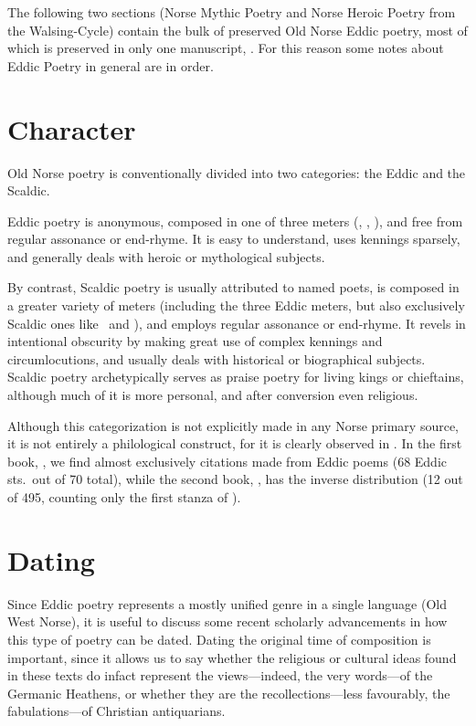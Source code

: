 
The following two sections (Norse Mythic Poetry and Norse Heroic Poetry from the Walsing-Cycle) contain the bulk of preserved Old Norse Eddic poetry, most of which is preserved in only one manuscript, \Regius.  For this reason some notes about Eddic Poetry in general are in order.

\section{Character}

Old Norse poetry is conventionally divided into two categories: the Eddic and the Scaldic.

Eddic poetry is anonymous, composed in one of three meters (\Fornyrdislag, \Ljodahattr, \Malahattr), and free from regular assonance or end-rhyme.  It is easy to understand, uses kennings sparsely, and generally deals with heroic or mythological subjects.

By contrast, Scaldic poetry is usually attributed to named poets, is composed in a greater variety of meters (including the three Eddic meters, but also exclusively Scaldic ones like \Kviduhattr\ and \Drottkvett), and employs regular assonance or end-rhyme.  It revels in intentional obscurity by making great use of complex kennings and circumlocutions, and usually deals with historical or biographical subjects.  Scaldic poetry archetypically serves as praise poetry for living kings or chieftains, although much of it is more personal, and after conversion even religious.

Although this categorization is not explicitly made in any Norse primary source, it is not entirely a philological construct, for it is clearly observed in \SnorraEdda.  In the first book, \Gylfaginning, we find almost exclusively citations made from Eddic poems (68 Eddic sts.~out of 70 total), while the second book, \Skaldskaparmal, has the inverse distribution (12 out of 495, counting only the first stanza of \Grottasongr).

\section{Dating}

Since Eddic poetry represents a mostly unified genre in a single language (Old West Norse), it is useful to discuss some recent scholarly advancements in how this type of poetry can be dated.  Dating the original time of composition is important, since it allows us to say whether the religious or cultural ideas found in these texts do infact represent the views---indeed, the very words---of the Germanic Heathens, or whether they are the recollections---less favourably, the fabulations---of Christian antiquarians.

